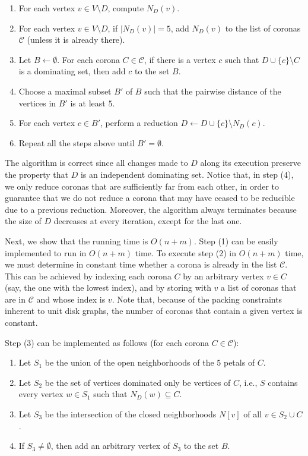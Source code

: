 \documentclass[preprint,12pt]{elsarticle}
\newcommand{\CC}{\mathcal{C}}
\begin{document}
\begin{enumerate}[(1)]
\item For each vertex $v \in V \setminus D$, compute $N_D(v)$.

\item For each vertex $v \in V \setminus D$, if $|N_D(v)| = 5$, add $N_D(v)$ to the list of coronas $\CC$ (unless it is already there).

\item Let $B \gets \emptyset$. For each corona $C \in \CC$, if there is a vertex $c$ such that $D \cup \{c\} \setminus C$ is a dominating set, then add $c$ to the set $B$.

\item Choose a maximal subset $B'$ of $B$ such that the pairwise distance of the vertices in $B'$ is at least $5$.

\item For each vertex $c \in B'$, perform a reduction $D \gets D \cup \{c\} \setminus N_D(c)$.

\item Repeat all the steps above until $B' = \emptyset$.
\end{enumerate}

The algorithm is correct since all changes made to $D$ along its execution preserve the property that $D$ is an independent dominating set. Notice that, in step (4), we only reduce coronas that are sufficiently far from each other, in order to guarantee that we do not reduce a corona that may have ceased to be reducible due to a previous reduction. Moreover, the algorithm always terminates because the size of $D$ decreases at every iteration, except for the last one. 

Next, we show that the running time is $O(n+m)$. 
Step (1) can be easily implemented to run in $O(n+m)$ time. To execute step (2) in $O(n+m)$ time, we must determine in constant time whether a corona is already in the list $\CC$. This can be achieved by indexing each corona $C$ by an arbitrary vertex $v \in C$ (say, the one with the lowest index), and by storing with $v$ a list of coronas that are in $\mathcal{C}$ and whose index is $v$. Note that, because of the packing constraints inherent to unit disk graphs, the number of coronas that contain a given vertex is constant.

Step (3) can be implemented as follows (for each corona $C \in \CC$):

\begin{enumerate}[(3a)]
\item Let $S_1$ be the union of the open neighborhoods of the $5$ petals of $C$.

\item Let $S_2$ be the set of vertices dominated only be vertices of $C$, i.e., $S$ contains every vertex $w \in S_1$ such that $N_D(w) \subseteq C$.

\item Let $S_3$ be the intersection of the closed neighborhoods $N[v]$ of all $v \in S_2 \cup C$.

\item If $S_3 \neq \emptyset$, then add an arbitrary vertex of $S_3$ to the set $B$.
\end{enumerate}
\end{document}
